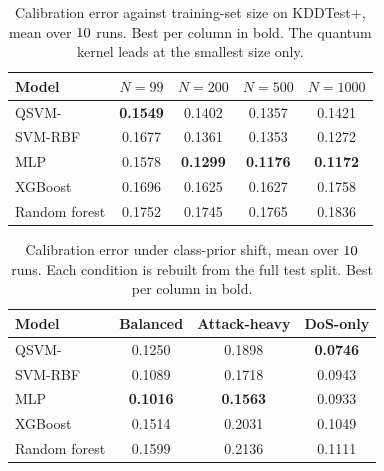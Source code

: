 \begin{table}[t]
\centering
\caption{Calibration error against training-set size on KDDTest+, mean over $10$ runs. Best per column in bold. The quantum kernel leads at the smallest size only.}
\label{tab:lowdata}
\begin{tabular}{lcccc}
\toprule
Model & $N=99$ & $N=200$ & $N=500$ & $N=1000$ \\
\midrule
QSVM-\ZZ{} & \textbf{0.1549} & 0.1402 & 0.1357 & 0.1421 \\
SVM-RBF & 0.1677 & 0.1361 & 0.1353 & 0.1272 \\
MLP & 0.1578 & \textbf{0.1299} & \textbf{0.1176} & \textbf{0.1172} \\
XGBoost & 0.1696 & 0.1625 & 0.1627 & 0.1758 \\
Random forest & 0.1752 & 0.1745 & 0.1765 & 0.1836 \\
\bottomrule
\end{tabular}
\end{table}

\begin{table}[t]
\centering
\caption{Calibration error under class-prior shift, mean over $10$ runs. Each condition is rebuilt from the full test split. Best per column in bold.}
\label{tab:priorshift}
\begin{tabular}{lccc}
\toprule
Model & Balanced & Attack-heavy & DoS-only \\
\midrule
QSVM-\ZZ{} & 0.1250 & 0.1898 & \textbf{0.0746} \\
SVM-RBF & 0.1089 & 0.1718 & 0.0943 \\
MLP & \textbf{0.1016} & \textbf{0.1563} & 0.0933 \\
XGBoost & 0.1514 & 0.2031 & 0.1049 \\
Random forest & 0.1599 & 0.2136 & 0.1111 \\
\bottomrule
\end{tabular}
\end{table}

